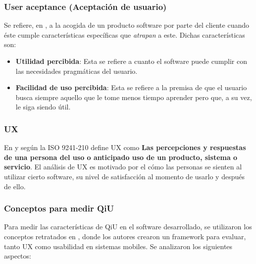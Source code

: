 \subsubsection{User aceptance (Aceptación de usuario)}

Se refiere, en \cite{quality_in_use}, a la acogida de un producto software por parte del cliente cuando éste cumple características específicas que \textit{atrapan} a este. Dichas características son:

\begin{itemize}
 \item \textbf{Utilidad percibida}: Esta se refiere a cuanto el software puede cumplir con las necesidades pragmáticas del usuario.
 \item \textbf{Facilidad de uso percibida}: Esta se refiere a la premisa de que el usuario busca siempre aquello que le tome menos tiempo aprender pero que, a su vez, le siga siendo útil.
\end{itemize}

\subsubsection{UX}

En \cite{quality_in_use} y según la ISO 9241-210 define UX como \textbf{Las percepciones y respuestas de una persona del uso o anticipado uso de un producto, sistema o servicio}. El análisis de UX es motivado por el cómo las personas se sienten al utilizar cierto software, su nivel de satisfacción al momento de usarlo y después de ello.

\subsubsection{Conceptos para medir QiU}

Para medir las características de QiU en el software desarrollado, se utilizaron los conceptos retratados en \cite{usability_ux}, donde los autores crearon un framework para evaluar, tanto UX como usabilidad en sistemas mobiles. Se analizaron los siguientes aspectos:

